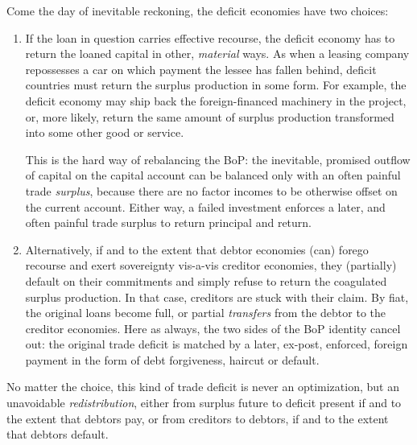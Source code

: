 \documentclass[11pt,a4paper,oneside,openright]{article}
\begin{document}
\begin{description}
\begin{enumerate}
		Come the day of inevitable reckoning, the deficit economies have two choices:
		\begin{enumerate}
			\item If the loan in question carries effective recourse, the deficit economy has to return the loaned capital in other, \emph{material} ways. 
			As when a leasing company repossesses a car on which payment the lessee has fallen behind, deficit countries must return the surplus production in some form. 
			For example, the deficit economy may ship back the foreign-financed machinery in the project, or, more likely, return the same amount of surplus production transformed into some other good or service. 
			
			This is the hard way of rebalancing the \gls{BoP}: 
			the inevitable, promised outflow of capital on the capital account can be balanced only with an often painful trade \emph{surplus}, because there are no factor incomes to be otherwise offset on the current account. 
			Either way, a failed investment enforces a later, and often painful trade surplus to return principal and return.

			\item Alternatively, if and to the extent that debtor economies (can) forego recourse and exert sovereignty vis-a-vis creditor economies, they (partially) default on their commitments and simply refuse to return the coagulated surplus production. 
			In that case, creditors are stuck with their claim. 
			By fiat, the original loans become full, or partial \emph{transfers} from the debtor to the creditor economies. 
			Here as always, the two sides of the \gls{BoP} identity cancel out: 
			the original trade deficit is matched by a later, ex-post, enforced, foreign payment in the form of debt forgiveness, haircut or default.
		\end{enumerate}

		No matter the choice, this kind of trade deficit is never an optimization, but an unavoidable \emph{redistribution}, either from surplus future to deficit present if and to the extent that debtors pay, or from creditors to debtors, if and to the extent that debtors default.
		

\end{enumerate}
\end{description}
\end{document}
